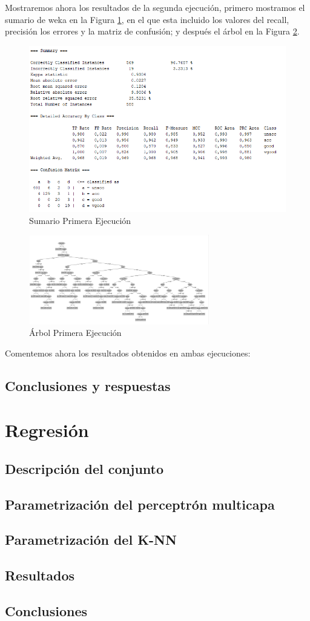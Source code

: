 \documentclass[a4paper, 11pt, twoside, openany, onecolumn, final]{memoir}
\begin{document}
	Mostraremos ahora los resultados de la segunda ejecución, primero mostramos el sumario de weka en la Figura \ref{SumarioSegundaEjecucion}, en el que esta incluido los valores del recall, precisión los errores y la matriz de confusión; y después el árbol en la Figura \ref{ArbolSegundaEjecucion}.
	\begin{figure}
  		\centering
   		\includegraphics{Imagenes/SummaryConEntreYValYBinarySplit}
  		\caption{Sumario Primera Ejecución}
  		\label{SumarioSegundaEjecucion}
	\end{figure}	
	
	\begin{figure}
  		\centering
   		\includegraphics[width=0.7\textwidth]{Imagenes/ArbolConEntreYValYBinarySplit}
  		\caption{Árbol Primera Ejecución}
  		\label{ArbolSegundaEjecucion}
	\end{figure}
	
	Comentemos ahora los resultados obtenidos en ambas ejecuciones:
	
	
	\section{Conclusiones y respuestas}
	\chapter{Regresión}
		\section{Descripción del conjunto}
	\section{Parametrización del perceptrón multicapa}
	\section{Parametrización del K-NN}
	\section{Resultados}
	\section{Conclusiones}
\end{document}
